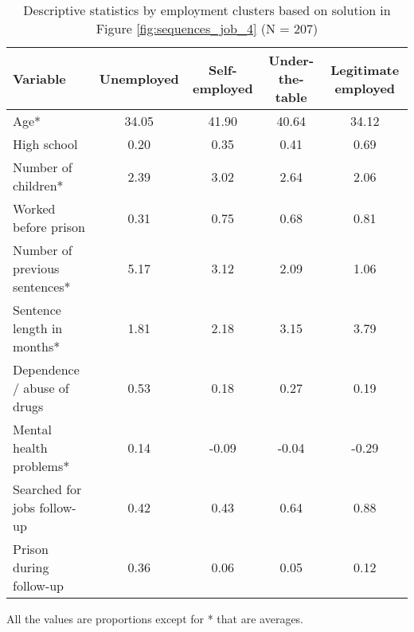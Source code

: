 \begin{table}[htp]
\footnotesize
\setlength{\tabcolsep}{10pt}
\renewcommand{\arraystretch}{1.3}
\begin{threeparttable}
\centering
\caption{Descriptive statistics by employment clusters \newline based on solution in Figure \ref{fig:sequences_job_4} (N = 207)} 
\label{tab:descriptives_job_4}
\begin{tabular}{lcccc}
  \hline
Variable & Unemployed & Self-employed & Under-the-table & Legitimate employed \\ 
  \hline
Age* & 34.05 & 41.90 & 40.64 & 34.12 \\ 
  High school & 0.20 & 0.35 & 0.41 & 0.69 \\ 
  Number of children* & 2.39 & 3.02 & 2.64 & 2.06 \\ 
  Worked before prison & 0.31 & 0.75 & 0.68 & 0.81 \\ 
  Number of previous sentences* & 5.17 & 3.12 & 2.09 & 1.06 \\ 
  Sentence length in months* & 1.81 & 2.18 & 3.15 & 3.79 \\ 
  Dependence / abuse of drugs & 0.53 & 0.18 & 0.27 & 0.19 \\ 
  Mental health problems* & 0.14 & -0.09 & -0.04 & -0.29 \\ 
  Searched for jobs follow-up & 0.42 & 0.43 & 0.64 & 0.88 \\ 
  Prison during follow-up & 0.36 & 0.06 & 0.05 & 0.12 \\ 
   \hline
\end{tabular}
\begin{tablenotes}
\scriptsize
\item All the values are proportions except for * that are averages.
\end{tablenotes}
\end{threeparttable}
\end{table}
